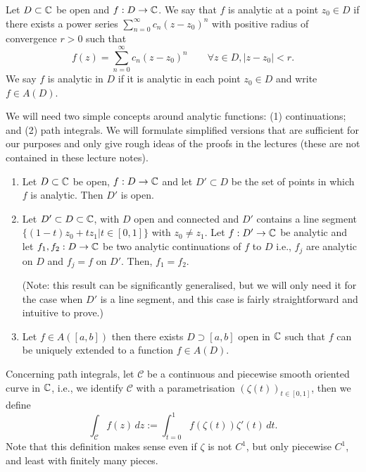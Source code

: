 \begin{definition}
  Let $D \subset \mathbb{C}$ be open and $f : D \to \mathbb{C}$. We say that $f$ is
  analytic at a point $z_0 \in D$ if there exists a power series
  $\sum_{n = 0}^\infty c_n (z - z_0)^n$ with  positive radius
  of convergence $r > 0$ such that
  \[
    f(z) = \sum_{n = 0}^\infty c_n (z - z_0)^n \qquad \forall
    z \in D, |z - z_0| < r.
  \]
  We say $f$ is analytic in $D$ if it is analytic in each point
  $z_0 \in D$ and write $f \in A(D)$.
\end{definition}

\medskip 

We will need two simple concepts around analytic functions: (1) continuations;
and (2) path integrals. We will formulate simplified versions that are
sufficient for our purposes and only give rough ideas of the proofs
in the lectures (these are not contained in these lecture notes).

\begin{proposition}
  \begin{enumerate} \ilist
    \item Let $D \subset \mathbb{C}$ be open, $f : D \to \mathbb{C}$ and let $D' \subset D$ be the
    set of points in which $f$ is analytic. Then $D'$ is open.
    \item Let $D' \subset D \subset \mathbb{C}$, with $D$ open and connected and $D'$
    contains a line segment $\{(1-t) z_0 + t z_1 | t \in [0,1] \}$ with $z_0
    \neq z_1$. Let $f : D' \to \mathbb{C}$ be analytic and let $f_1, f_2 : D \to \mathbb{C}$ be
    two analytic continuations of $f$ to $D$ i.e., $f_j$ are analytic on $D$ and
    $f_j = f$ on $D'$. Then, $f_1 = f_2$.

    (Note: this result can be significantly generalised, but we will only need it for the case when $D'$ is a line segment, and this case is fairly straightforward and intuitive to prove.)
    \item Let $f \in A([a, b])$ then there exists $D \supset [a,b]$ open in $\mathbb{C}$
    such that $f$ can be uniquely extended to a function $f \in A(D)$.
  \end{enumerate}
\end{proposition}

\def\calC{\mathcal{C}}

Concerning path integrals, let $\calC$ be a continuous and piecewise smooth
oriented  curve in $\mathbb{C}$, i.e., we identify $\calC$ with a parametrisation $(\zeta(t))_{t \in [0, 1]}$, then we define 
\[
    \int_{\calC} f(z) \, dz := \int_{t = 0}^1 f(\zeta(t)) \zeta'(t) \, dt.
\]
Note that this definition makes sense even if $\zeta$ is not $C^1$, but
only piecewise $C^1$, and least with finitely many pieces. 

